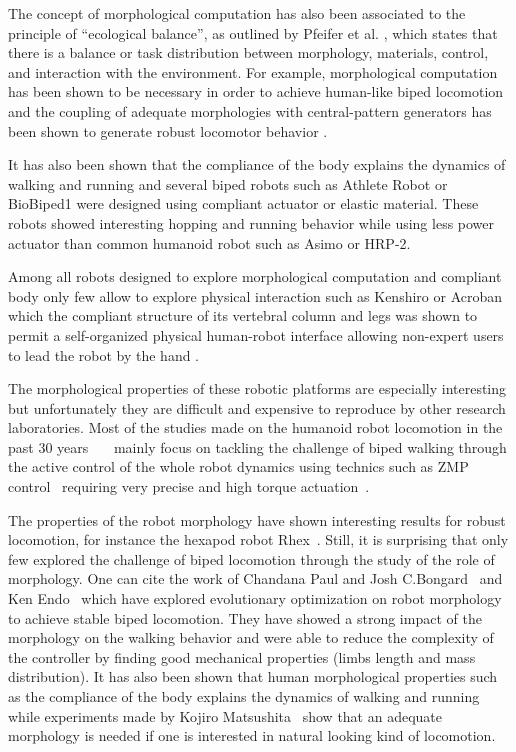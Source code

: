 The concept of morphological computation has also been associated to the principle of “ecological balance”, as outlined by Pfeifer et al. \cite{pfeifer2005new}, which states that there is a balance or task distribution between morphology, materials, control, and interaction with the environment. For example, morphological computation has been shown to be necessary in order to achieve human-like biped locomotion \cite{matsushita2005locomoting} and the coupling of adequate morphologies with central-pattern generators has been shown to generate robust locomotor behavior \cite{ijspeert2007swimming}\cite{steingrube2010self}.


It has also been shown that the compliance of the body explains the dynamics of walking and running \cite{Geyer2006} and several biped robots such as Athlete Robot \cite{niiyama2010athlete} or BioBiped1 \cite{radkhah2011concept} were designed using compliant actuator or elastic material. These robots showed interesting hopping and running behavior while using less power actuator than common humanoid robot such as Asimo or HRP-2.

Among all robots designed to explore morphological computation and compliant body only few allow to explore physical interaction such as Kenshiro \cite{Asano2012} or Acroban which the compliant structure of its vertebral column and legs was shown to permit a self-organized physical human-robot interface allowing non-expert users to lead the robot by the hand \cite{Ly2011bio}\cite{Oudeyer2011}.

The morphological properties of these robotic platforms are especially interesting but unfortunately they are difficult and expensive to reproduce by other research laboratories.
Most of the studies made on the humanoid robot locomotion in the past 30 years~\cite{park1998biped}~\cite{aoi2005locomotion}~\cite{park1998biped} mainly focus on tackling the challenge of biped walking through the active control of the whole robot dynamics using technics such as ZMP control~\cite{vukobratovic2004zero} requiring very precise and high torque actuation~\cite{akachi2005development}.

The properties of the robot morphology have shown interesting results for robust locomotion, for instance the hexapod robot Rhex~\cite{saranli2001rhex}. Still, it is surprising that only few explored the challenge of biped locomotion through the study of the role of morphology.
One can cite the work of Chandana Paul and Josh C.Bongard~\cite{paul2001road} and Ken Endo~\cite{endo2002co} which have explored evolutionary optimization on robot morphology to achieve stable biped locomotion. They have showed a strong impact of the morphology on the walking behavior and were able to reduce the complexity of the controller by finding good mechanical properties (limbs length and mass distribution). It has also been shown that human morphological properties such as the compliance of the body explains the dynamics of walking and running \cite{Geyer2006} while experiments made by Kojiro Matsushita~\cite{matsushita2005locomoting} show that an adequate morphology is needed if one is interested in natural looking kind of locomotion.


